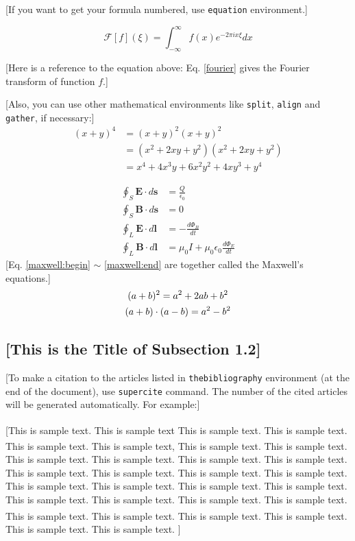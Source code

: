 \documentclass[a4paper,11pt,onecolumn,twoside]{article}
\newcommand{\supercite}[1]{\textsuperscript{\cite{#1}}}
\begin{document}
[If you want to get your formula numbered, use \texttt{equation} environment.]

  \begin{equation} \label{fourier}
    \mathcal{F}[f](\xi) = \int_{-\infty}^{\infty} f(x) e^{-2\pi ix \xi} dx
  \end{equation}

[Here is a reference to the equation above: Eq. \ref{fourier} gives the Fourier transform of function $f$.]

  [Also, you can use other mathematical environments like \texttt{split}, \texttt{align} and \texttt{gather}, if necessary:]
  \begin{equation}
  \begin{split}
    (x+y)^4 &= (x+y)^2 (x+y)^2 \\
            &= (x^2+2xy+y^2)(x^2+2xy+y^2) \\
            &= x^4 + 4x^3y+6x^2y^2+4xy^3+y^4
  \end{split}
  \end{equation}

  \begin{align}
    \oint_S \mathbf{E} \cdot d \mathbf{s} &= \frac{Q}{\epsilon_0}
                                              \label{maxwell:begin} \\
    \oint_S \mathbf{B} \cdot d \mathbf{s} &= 0 \\
    \oint_L \mathbf{E} \cdot d \mathbf{l} &= -\frac{d\Phi_B}{dt} \\
    \oint_L \mathbf{B} \cdot d \mathbf{l} &= \mu_0 I +
               \mu_0 \epsilon_0 \frac{d\Phi_E}{dt} \label{maxwell:end}
  \end{align}
  [Eq. \ref{maxwell:begin} $\sim$ \ref{maxwell:end} are together called the
Maxwell's equations.]
  \begin{gather}
    (a + b)^2 = a^2 + 2ab + b^2      \notag   \\
    (a + b) \cdot (a - b) = a^2 - b^2
  \end{gather}


\subsection{[This is the Title of Subsection 1.2]}
[To make a citation to the articles listed in \texttt{thebibliography} environment (at the end of the document), use \texttt{supercite} command. The number of the cited articles will be generated automatically. For example:]

[This is sample text. This is sample text\supercite{chendh, whiteside} This is sample text. This is sample text. This is sample text. This is sample text\supercite{calms}, This is sample text. This is sample text. This is sample text. This is sample text. This is sample text. This is sample text. This is sample text. This is sample text. This is sample text. This is sample text. This is sample text. This is sample text. This is sample text. This is sample text. This is sample text. This is sample text. This is sample text. This is sample text. This is sample text. This is sample text. This is sample text. This is sample text\supercite{obrien}. This is sample text. This is sample text. ]
\end{document}
